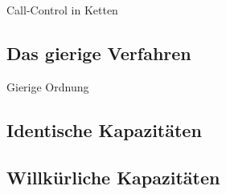 \begin{section}{Call-Control in Ketten}

\subsection{Das gierige Verfahren}

\begin{frame}{Gierige Ordnung}
	
\end{frame}

\begin{frame}
	\begin{figure}[htbp]
		\centering
		\small
		\def\svgwidth{220bp}
		
		\label{fig:k-coloring}
	\end{figure}
	
	
\end{frame}
	
\subsection{Identische Kapazitäten}
\begin{frame}


\end{frame}


\subsection{Willkürliche Kapazitäten}
\begin{frame}
	
\end{frame}
\end{section}